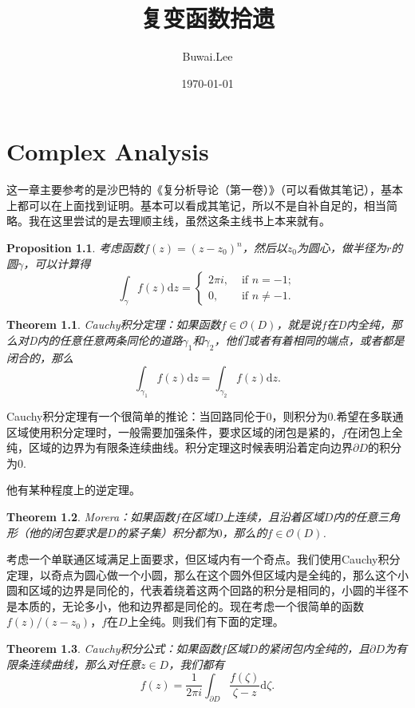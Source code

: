 \documentclass[10pt]{book}
\theoremstyle{plain}%
\newtheorem{pro}{Proposition}[chapter]%
\newtheorem{theo}{Theorem}[chapter]%
\begin{document}
\title{复变函数拾遗}
\author{Buwai.Lee}
\date{\today}
\maketitle %

\chapter{Complex Analysis}
这一章主要参考的是沙巴特的《复分析导论（第一卷）》（可以看做其笔记），基本上都可以在上面找到证明。基本可以看成其笔记，所以不是自补自足的，相当简略。我在这里尝试的是去理顺主线，虽然这条主线书上本来就有。

\begin{pro}
考虑函数$f(z)=(z-z_0)^n$，然后以$z_0$为圆心，做半径为$r$的圆$\gamma$，可以计算得\[
\int_{\gamma}f(z)\mathrm{d}z=\begin{cases}
	2\pi i, &\text{ if }n=-1;\\
	0,&\text{ if }n\neq-1.
\end{cases}
\]
\end{pro}
\begin{theo}
	Cauchy积分定理：如果函数$f \in \mathcal{O}(D)$，就是说$f$在D内全纯，那么对D内的任意任意两条同伦的道路$\gamma_1$和$\gamma_2$，他们或者有着相同的端点，或者都是闭合的，那么
	\[
		\int_{\gamma_1}f(z)\mathrm{d}z=\int_{\gamma_2}f(z)\mathrm{d}z.
	\]
\end{theo}
Cauchy积分定理有一个很简单的推论：当回路同伦于0，则积分为0.希望在多联通区域使用积分定理时，一般需要加强条件，要求区域的闭包是紧的，$f$在闭包上全纯，区域的边界为有限条连续曲线。积分定理这时候表明沿着定向边界$\partial D$的积分为0.

他有某种程度上的逆定理。
\begin{theo}
	Morera：如果函数$f $在区域$D$上连续，且沿着区域$D$内的任意三角形（他的闭包要求是$D$的紧子集）积分都为$0$，那么的$f \in \mathcal{O}(D)$.
\end{theo}
考虑一个单联通区域满足上面要求，但区域内有一个奇点。我们使用Cauchy积分定理，以奇点为圆心做一个小圆，那么在这个圆外但区域内是全纯的，那么这个小圆和区域的边界是同伦的，代表着绕着这两个回路的积分是相同的，小圆的半径不是本质的，无论多小，他和边界都是同伦的。现在考虑一个很简单的函数$f(z)/(z-z_0)$，$f$在$D$上全纯。则我们有下面的定理。

\begin{theo}
	Cauchy积分公式：如果函数$f$区域$D$的紧闭包内全纯的，且$\partial D$为有限条连续曲线，那么对任意$z\in D$，我们都有
	\[
		f(z)=\frac{1}{2\pi i}\int_{\partial D}\frac{f(\zeta)}{\zeta -z}\mathrm{d}\zeta.
	\]
\end{theo}
\end{document}
